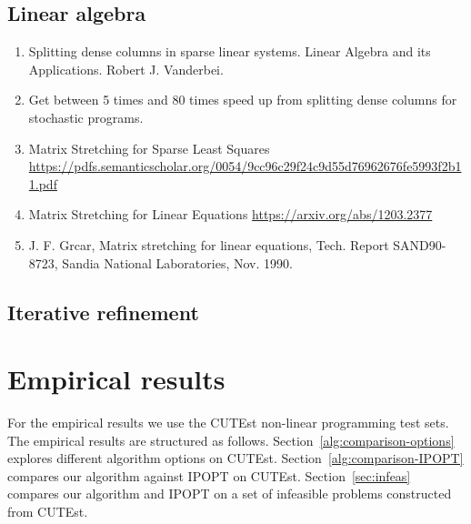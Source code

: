 \documentclass{article}
\begin{document}

%
\subsection{Linear algebra}\label{sec:linear-algebra}


\begin{enumerate}
\item Splitting dense columns in sparse linear systems. Linear Algebra and its Applications. Robert J. Vanderbei. \cite{vanderbei1991splitting}
\item \cite{lustig1991formulating} Get between 5 times and 80 times speed up from splitting dense columns for stochastic programs.
\item Matrix Stretching for Sparse Least Squares \url{https://pdfs.semanticscholar.org/0054/9cc96c29f24c9d55d76962676fe5993f2b11.pdf}
\item Matrix Stretching for Linear Equations \url{https://arxiv.org/abs/1203.2377}
\item J. F. Grcar, Matrix stretching for linear equations, Tech. Report SAND90-8723, Sandia
National Laboratories, Nov. 1990.
\end{enumerate}

\subsection{Iterative refinement}

\section{Empirical results}\label{sec:empirical-results}

For the empirical results we use the CUTEst non-linear programming test sets. The empirical results are structured as follows. Section~\ref{alg:comparison-options} explores different algorithm options on CUTEst.  Section~\ref{alg:comparison-IPOPT} compares our algorithm against IPOPT on CUTEst. Section~\ref{sec:infeas} compares our algorithm and IPOPT on a set of infeasible problems constructed from CUTEst. %
\end{document}
